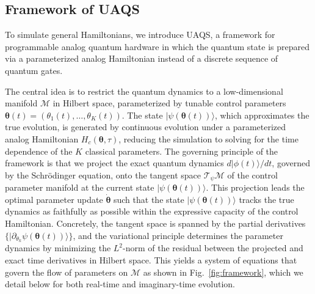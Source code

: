 \documentclass[twocolumn,
pra,aps,superscriptaddress,showpacs,amsmath,amssymb]{revtex4-2}
\begin{document}
\subsection{Framework of UAQS}

To simulate general Hamiltonians, we introduce UAQS, a framework for programmable analog quantum hardware in which the quantum state is prepared via a parameterized analog Hamiltonian instead of a discrete sequence of quantum gates. 

The central idea is to restrict the quantum dynamics to a low-dimensional manifold $\mathcal{M}$ in Hilbert space, parameterized by tunable control parameters $\bm{\theta}(t)=(\theta_1(t),\ldots,\theta_K(t))$. The state $|\psi(\bm{\theta}(t))\rangle$, which approximates the true evolution, is generated by continuous evolution under a parameterized analog Hamiltonian $H_c(\bm{\theta},\tau)$, reducing the simulation to solving for the time dependence of the $K$ classical parameters.
The governing principle of the framework is that we project the exact quantum dynamics $d|\phi(t)\rangle/dt$, governed by the Schrödinger equation, onto the tangent space $\mathcal{T}_\psi \mathcal{M}$ of the control parameter manifold at the current state $|\psi(\bm{\theta}(t))\rangle$. This projection leads the optimal parameter update $\dot{\bm{\theta}}$ such that the  state $|\psi(\bm{\theta}(t))\rangle$ tracks the true dynamics as faithfully as possible within the expressive capacity of the control Hamiltonian. 
Concretely, the tangent space is spanned by the partial derivatives $\{|\partial_{\theta_k} \psi(\bm{\theta}(t))\rangle\}$, and the variational principle determines the parameter dynamics by minimizing the $L^2$-norm of the residual between the projected and exact time derivatives in Hilbert space. This yields a system of equations that govern the flow of parameters on $\mathcal{M}$ as shown in Fig.~\ref{fig:framework}, which we detail below for both real-time and imaginary-time evolution.\\
\end{document}
